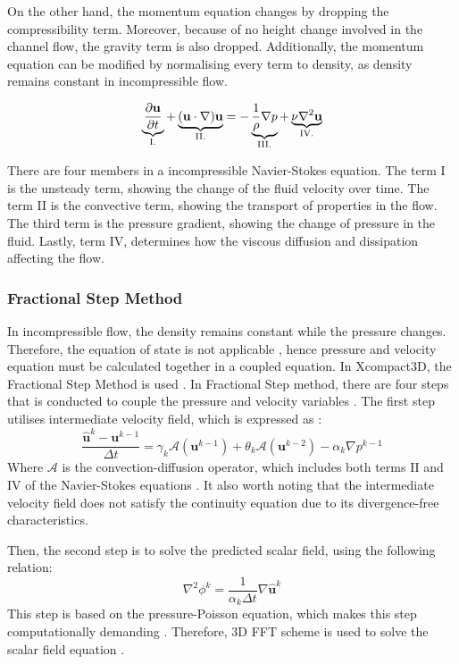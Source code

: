 On the other hand, the momentum equation changes by dropping the compressibility term. Moreover, because of no height change involved in the channel flow, the gravity term is also dropped. Additionally, the momentum equation can be modified by normalising every term to density, as density remains constant in incompressible flow.

\begin{equation}
	\underbrace{\frac{\partial \mathbf{u}}{\partial t}}_{\rm I.} + \underbrace{(\mathbf{u}\cdot \nabla)\mathbf{u}}_{\rm II.} = - \underbrace{\frac{1}{\rho}\nabla p}_{\rm III.} + \underbrace{\nu \nabla^2 \mathbf{u}}_{\rm IV.}
\end{equation}

There are four members in a incompressible Navier-Stokes equation. The term I is the unsteady term, showing the change of the fluid velocity over time. The term II is the convective term, showing the transport of properties in the flow. The third term is the pressure gradient, showing the change of pressure in the fluid. Lastly, term IV, determines how the viscous diffusion and dissipation affecting the flow.

\subsubsection{Fractional Step Method}
\label{sec:Frac_step}
In incompressible flow, the density remains constant while the pressure changes. Therefore, the equation of state is not applicable \cite{Konoszy2024}, hence pressure and velocity equation must be calculated together in a coupled equation. In Xcompact3D, the Fractional Step Method is used \cite{Laizet2024}. In Fractional Step method, there are four steps that is conducted to couple the pressure and velocity variables \cite{Westra2002}. The first step utilises intermediate velocity field, which is expressed as \cite{vanKan1986}:
\begin{equation}
	\frac{\hat{\mathbf{u}}^{k} - \mathbf{u}^{k-1}} {\Delta t} = \gamma_{k} \mathcal{A}(\mathbf{u}^{k-1}) + \theta_{k} \mathcal{A}(\mathbf{u}^{k-2}) - \alpha_{k} \nabla p^{k-1}
\end{equation}
Where $\mathcal{A}$ is the convection-diffusion operator, which includes both terms II and IV of the Navier-Stokes equations \cite{Tamas2019}. It also worth noting that the intermediate velocity field does not satisfy the continuity equation due to its divergence-free characteristics.

Then, the second step is to solve the predicted scalar field, using the following relation:
\begin{equation}
	\nabla^2 \phi^{k} = \frac{1}{\alpha_k \Delta t}\nabla{\hat{\mathbf{u}}^k}
\end{equation}
This step is based on the pressure-Poisson equation, which makes this step computationally demanding \cite{Tamas2019}. Therefore, 3D FFT scheme is used to solve the scalar field equation \cite{Li2010}.

